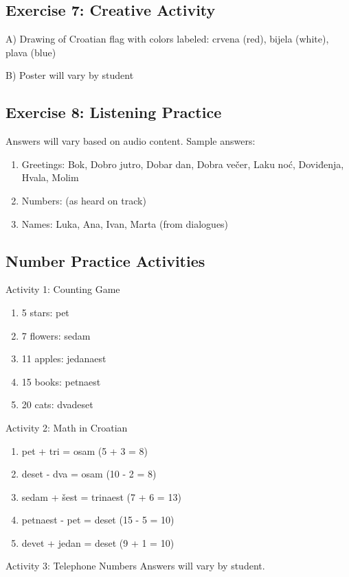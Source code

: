 \subsection*{Exercise 7: Creative Activity}

A) Drawing of Croatian flag with colors labeled: crvena (red), bijela (white), plava (blue)

B) Poster will vary by student

\subsection*{Exercise 8: Listening Practice}

Answers will vary based on audio content. Sample answers:
\begin{enumerate}
    \item Greetings: Bok, Dobro jutro, Dobar dan, Dobra večer, Laku noć, Doviđenja, Hvala, Molim
    \item Numbers: (as heard on track)
    \item Names: Luka, Ana, Ivan, Marta (from dialogues)
\end{enumerate}

\subsection*{Number Practice Activities}

Activity 1: Counting Game
\begin{enumerate}
    \item 5 stars: pet
    \item 7 flowers: sedam
    \item 11 apples: jedanaest
    \item 15 books: petnaest
    \item 20 cats: dvadeset
\end{enumerate}

Activity 2: Math in Croatian
\begin{enumerate}
    \item pet + tri = osam (5 + 3 = 8)
    \item deset - dva = osam (10 - 2 = 8)
    \item sedam + šest = trinaest (7 + 6 = 13)
    \item petnaest - pet = deset (15 - 5 = 10)
    \item devet + jedan = deset (9 + 1 = 10)
\end{enumerate}

Activity 3: Telephone Numbers
Answers will vary by student.

